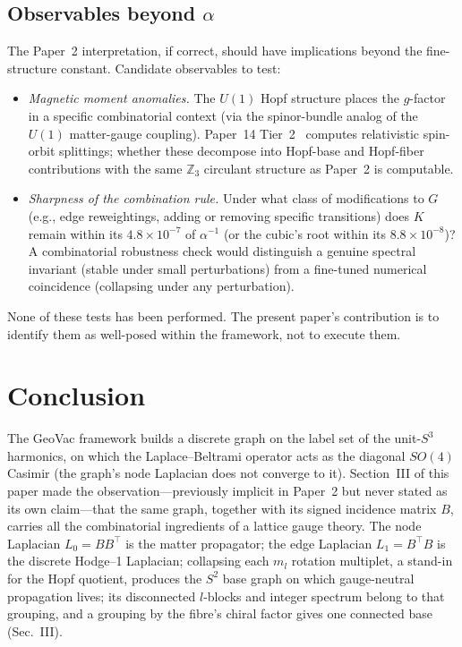 \documentclass[aps,pra,twocolumn,superscriptaddress,longbibliography]{revtex4-2}
\begin{document}
\subsection{Observables beyond $\alpha$}

The Paper~2 interpretation, if correct, should have implications
beyond the fine-structure constant.  Candidate observables to test:
\begin{itemize}
\item \emph{Magnetic moment anomalies.}  The $U(1)$ Hopf structure
  places the $g$-factor in a specific combinatorial context (via
  the spinor-bundle analog of the $U(1)$ matter-gauge coupling).
  Paper~14 Tier~2~\cite{Paper14} computes relativistic spin-orbit
  splittings; whether these decompose into Hopf-base and
  Hopf-fiber contributions with the same $\mathbb{Z}_3$ circulant
  structure as Paper~2 is computable.
\item \emph{Sharpness of the combination rule.}  Under what class of
  modifications to $G$ (e.g., edge reweightings, adding or removing
  specific transitions) does $K$ remain within its $4.8\times10^{-7}$
  of $\alpha^{-1}$ (or the cubic's root within its $8.8\times10^{-8}$)?  A combinatorial robustness check would distinguish
  a genuine spectral invariant (stable under small perturbations)
  from a fine-tuned numerical coincidence (collapsing under any
  perturbation).
\end{itemize}
None of these tests has been performed.  The present paper's
contribution is to identify them as well-posed within the framework,
not to execute them.


\section{Conclusion}
\label{sec:conclusion}

The GeoVac framework builds a discrete graph on the label set of the
unit-$S^3$ harmonics, on which the Laplace--Beltrami operator acts as
the diagonal $SO(4)$ Casimir (the graph's node Laplacian does not
converge to it).  Section~III of this paper made the
observation---previously implicit in Paper~2 but never
stated as its own claim---that the same graph, together with its
signed incidence matrix $B$, carries all the combinatorial
ingredients of a lattice gauge theory.  The node Laplacian
$L_0 = B B^{\top}$ is the matter propagator; the edge Laplacian
$L_1 = B^{\top} B$ is the discrete Hodge--1 Laplacian; collapsing
each $m_l$ rotation multiplet, a stand-in for the Hopf quotient,
produces the $S^2$ base graph on which gauge-neutral propagation
lives; its disconnected $l$-blocks and integer spectrum belong to that
grouping, and a grouping by the fibre's chiral factor gives one
connected base (Sec.~III).
\end{document}
